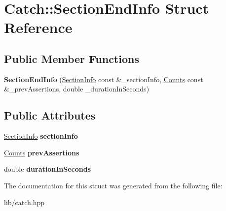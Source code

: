 \hypertarget{struct_catch_1_1_section_end_info}{}\section{Catch\+:\+:Section\+End\+Info Struct Reference}
\label{struct_catch_1_1_section_end_info}
\subsection*{Public Member Functions}
\begin{DoxyCompactItemize}
\item 
\mbox{\label{struct_catch_1_1_section_end_info_abc9381c7c22b6907317ec985ccaa6713}} 
{\bfseries Section\+End\+Info} (\mbox{\hyperlink{struct_catch_1_1_section_info}{Section\+Info}} const \&\+\_\+section\+Info, \mbox{\hyperlink{struct_catch_1_1_counts}{Counts}} const \&\+\_\+prev\+Assertions, double \+\_\+duration\+In\+Seconds)
\end{DoxyCompactItemize}
\subsection*{Public Attributes}
\begin{DoxyCompactItemize}
\item 
\mbox{\label{struct_catch_1_1_section_end_info_a2d44793392cb83735d086d726822abe9}} 
\mbox{\hyperlink{struct_catch_1_1_section_info}{Section\+Info}} {\bfseries section\+Info}
\item 
\mbox{\label{struct_catch_1_1_section_end_info_ae70b154cbc05b5dd2901d97f89303d8c}} 
\mbox{\hyperlink{struct_catch_1_1_counts}{Counts}} {\bfseries prev\+Assertions}
\item 
\mbox{\label{struct_catch_1_1_section_end_info_a7c262f2dab9cff166b8eca620c47eea5}} 
double {\bfseries duration\+In\+Seconds}
\end{DoxyCompactItemize}


The documentation for this struct was generated from the following file\+:\begin{DoxyCompactItemize}
\item 
lib/catch.\+hpp\end{DoxyCompactItemize}
